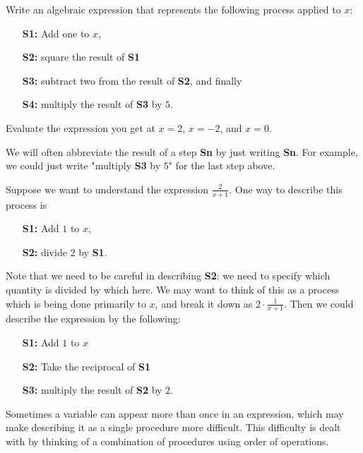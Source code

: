 \begin{question} Write an algebraic expression that represents the following process applied to $x$:
\begin{enumerate}
\item[\bf S1:] Add one to $x$,
\item[\bf S2:] square the result of {\bf S1}
\item[\bf S3:] subtract two from the result of {\bf S2}, and finally
\item[\bf S4:] multiply the result of {\bf S3} by $5$.  
\end{enumerate}
Evaluate the expression you get at $x=2$, $x=-2$, and $x=0$.
\end{question}

\par
We will often abbreviate the result of a step {\bf Sn} by just writing {\bf Sn}.  For example, we could just write "multiply {\bf S3} by $5$" for the last step above.  
\par

\begin{eg} \label{E:recip}  Suppose we want to understand the expression $\frac{2}{x+1}$.  One way to describe this process is
\begin{enumerate}
\item[\bf S1:] Add $1$ to $x$, 
\item[\bf S2:] divide $2$ by {\bf S1}. 
\end{enumerate}
Note that we need to be careful in describing {\bf S2}:  we need to specify which quantity is divided by which here.  
We may want to think of this as a process which is being done primarily to $x$, and break it down as $2 \cdot \frac{1}{x+1}$.  Then we could describe the expression by the following: 
\begin{enumerate}
\item[\bf S1:] Add $1$ to  $x$
\item[\bf S2:] Take the reciprocal of {\bf S1}
\item[\bf S3:] multiply the result of {\bf S2} by $2$.  
\end{enumerate}
\end{eg}
\par
Sometimes a variable can appear more than once in an expression, which may make describing it as a single procedure more difficult. This difficulty is dealt with by thinking of a combination of procedures using order of operations.

\par

